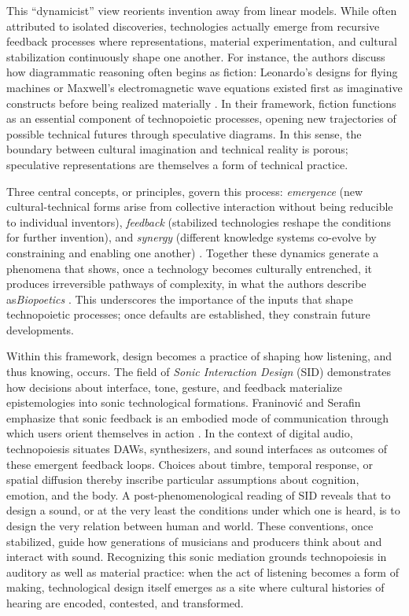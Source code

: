 This “dynamicist” view reorients invention away from linear models. While often attributed to isolated discoveries, technologies actually emerge from recursive feedback processes where representations, material experimentation, and cultural stabilization continuously shape one another. For instance, the authors discuss how diagrammatic reasoning often begins as fiction: Leonardo’s designs for flying machines or Maxwell’s electromagnetic wave equations existed first as imaginative constructs before being realized materially \parencites[pp. 249–251]{Guerra_Ostergaard_2017}. In their framework, fiction functions as an essential component of technopoietic processes, opening new trajectories of possible technical futures through speculative diagrams. In this sense, the boundary between cultural imagination and technical reality is porous; speculative representations are themselves a form of technical practice.

Three central concepts, or principles, govern this process: \emph{emergence} (new cultural-technical forms arise from collective interaction without being reducible to individual inventors), \emph{feedback} (stabilized technologies reshape the conditions for further invention), and \emph{synergy} (different knowledge systems co-evolve by constraining and enabling one another) \parencites[251]{Guerra_Ostergaard_2017}. Together these dynamics generate a phenomena that shows, once a technology becomes culturally entrenched, it produces irreversible pathways of complexity, in what the authors describe as\emph{Biopoetics} \parencites[251-252]{Guerra_Ostergaard_2017}. This underscores the importance of the inputs that shape technopoietic processes; once defaults are established, they constrain future developments.

Within this framework, design becomes a practice of shaping how listening, and thus knowing, occurs. The field of \textit{Sonic Interaction Design} (SID) demonstrates how decisions about interface, tone, gesture, and feedback materialize epistemologies into sonic technological formations. Franinović and Serafin emphasize that sonic feedback is an embodied mode of communication through which users orient themselves in action \parencite{Franinovic_Serafin_2013}. In the context of digital audio, technopoiesis situates DAWs, synthesizers, and sound interfaces as outcomes of these emergent feedback loops. Choices about timbre, temporal response, or spatial diffusion thereby inscribe particular assumptions about cognition, emotion, and the body. A post-phenomenological reading of SID reveals that to design a sound, or at the very least the conditions under which one is heard, is to design the very relation between human and world. These conventions, once stabilized, guide how generations of musicians and producers think about and interact with sound. Recognizing this sonic mediation grounds technopoiesis in auditory as well as material practice: when the act of listening becomes a form of making, technological design itself emerges as a site where cultural histories of hearing are encoded, contested, and transformed.

